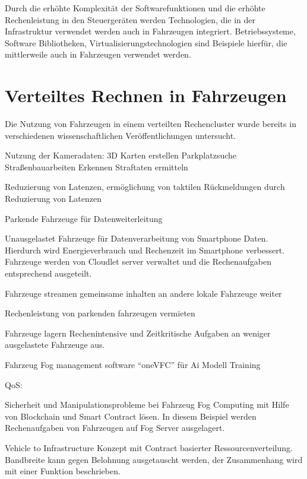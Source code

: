 Durch die erhöhte Komplexität der Softwarefunktionen und die erhöhte Rechenleistung in den Steuergeräten werden Technologien, die in der  Infrastruktur verwendet werden auch in Fahrzeugen integriert. Betriebssysteme, Software Bibliotheken, Virtualisierungstechnologien sind Beispiele hierfür, die mittlerweile auch in Fahrzeugen verwendet werden.

\section{Verteiltes Rechnen in Fahrzeugen}

Die Nutzung von Fahrzeugen in einem verteilten Rechencluster wurde bereits in verschiedenen wissenschaftlichen Veröffentlichungen untersucht. 

Nutzung der Kameradaten:
 3D Karten erstellen
 Parkplatzsuche
 Straßenbauarbeiten Erkennen
 Straftaten ermitteln \cite{Zhu2018}

Reduzierung von Latenzen, ermöglichung von taktilen Rückmeldungen durch Reduzierung von Latenzen \cite{Mukherjee2020}

Parkende Fahrzeuge für Datenweiterleitung \cite{Malandrino2014} \cite{Liu2011}

Unausgelastet Fahrzeuge für Datenverarbeitung von Smartphone Daten. Hierdurch wird Energieverbrauch und Rechenzeit im Smartphone verbessert. Fahrzeuge werden von Cloudlet server verwaltet und die Rechenaufgaben entsprechend ausgeteilt. \cite{Zhang2015}

Fahrzeuge streamen gemeinsame inhalten an andere lokale Fahrzeuge weiter \cite{Kharel2019}

Rechenleistung von parkenden fahrzeugen vermieten\cite{Arif2012}

Fahrzeuge lagern Rechenintensive und Zeitkritische Aufgaben an weniger ausgelastete Fahrzeuge aus. \cite{Liao2019} \cite{Wu2020}


Fahrzeug Fog management software \enquote{oneVFC} für Ai Modell Training \cite{Phung2021}

QoS:

Sicherheit und Manipulationsprobleme bei Fahrzeug Fog Computing mit Hilfe von Blockchain und Smart Contract lösen. In diesem Beispiel werden Rechenaufgaben von Fahrzeugen auf Fog Server ausgelagert.\cite{Liao2021}

Vehicle to Infrastructure Konzept mit Contract basierter Ressourcenverteilung. Bandbreite kann gegen Belohnung ausgetauscht werden, der Zusammenhang wird mit einer Funktion beschrieben.\cite{Zhao2020}




